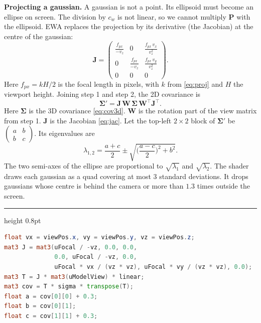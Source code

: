 \documentclass[9pt,twocolumn,a4paper]{extarticle}
\newenvironment{codebox}{\par\vspace{5pt}\noindent\begin{minipage}{\columnwidth}\hrule height 0.8pt\vspace{2pt}}{\end{minipage}\par\vspace{5pt}\noindent\ignorespaces}
\newcommand{\code}[1]{\texttt{#1}}
\newcommand{\Sig}{\symbf{\Sigma}}
\begin{document}
\textbf{Projecting a gaussian.} A gaussian is not a point. Its ellipsoid must become an ellipse on screen. The division by $c_w$ is not linear, so we cannot multiply $\mathbf{P}$ with the ellipsoid. EWA replaces the projection by its derivative (the Jacobian) at the centre of the gaussian:
\begin{equation}
\mathbf{J}=\begin{pmatrix}
\frac{f_{px}}{-v_z}&0&\frac{f_{px}\,v_x}{v_z^{2}}\\[1mm]
0&\frac{f_{px}}{-v_z}&\frac{f_{px}\,v_y}{v_z^{2}}\\[1mm]
0&0&0
\end{pmatrix}.
\label{eq:jac}
\end{equation}
Here $f_{px}=kH/2$ is the focal length in pixels, with $k$ from \eqref{eq:proj} and $H$ the viewport height. Joining step 1 and step 2, the 2D covariance is
\begin{equation}
\Sig'=\mathbf{J}\,\mathbf{W}\,\Sig\,\mathbf{W}^{\top}\mathbf{J}^{\top}.
\label{eq:ewa}
\end{equation}
Here $\Sig$ is the 3D covariance \eqref{eq:cov3d}. $\mathbf{W}$ is the rotation part of the view matrix from step 1. $\mathbf{J}$ is the Jacobian \eqref{eq:jac}. Let the top-left $2\times2$ block of $\Sig'$ be $\begin{pmatrix}a&b\\b&c\end{pmatrix}$. Its eigenvalues are
\begin{equation}
\lambda_{1,2}=\frac{a+c}{2}\pm\sqrt{\Big(\frac{a-c}{2}\Big)^{2}+b^{2}}.
\label{eq:eig}
\end{equation}
The two semi-axes of the ellipse are proportional to $\sqrt{\lambda_1}$ and $\sqrt{\lambda_2}$. The shader draws each gaussian as a quad covering at most 3 standard deviations. It drops gaussians whose centre is behind the camera or more than $1.3$ times outside the screen.

\begin{codebox}
\begin{lstlisting}[language=GLSL,caption={\code{render/shaders/splat\_prep.vert}: Jacobian $\mathbf{J}$ and $\Sigma'=\mathbf{J}\mathbf{W}\Sigma\mathbf{W}^{\top}\mathbf{J}^{\top}$},label={lst:ewa}]
float vx = viewPos.x, vy = viewPos.y, vz = viewPos.z;
mat3 J = mat3(uFocal / -vz, 0.0, 0.0,
              0.0, uFocal / -vz, 0.0,
              uFocal * vx / (vz * vz), uFocal * vy / (vz * vz), 0.0);
mat3 T = J * mat3(uModelView) * linear;
mat3 cov = T * sigma * transpose(T);
float a = cov[0][0] + 0.3;
float b = cov[0][1];
float c = cov[1][1] + 0.3;
\end{lstlisting}
\end{codebox}
\end{document}
